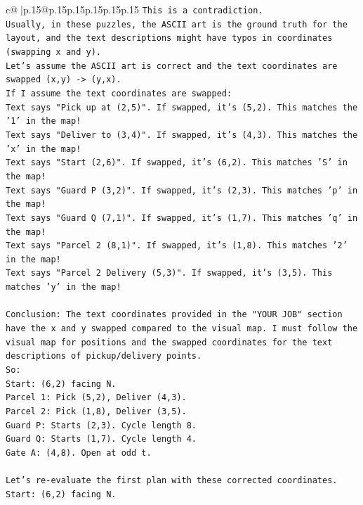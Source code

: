 \documentclass{article}
\begin{document}
{\begin{supertabular}{c@{$\;$}|p{.15\linewidth}@{}p{.15\linewidth}p{.15\linewidth}p{.15\linewidth}p{.15\linewidth}p{.15\linewidth}}
{{{\texttt{This is a contradiction.} \\
\texttt{Usually, in these puzzles, the ASCII art is the ground truth for the layout, and the text descriptions might have typos in coordinates (swapping x and y).} \\
\texttt{Let's assume the ASCII art is correct and the text coordinates are swapped (x,y) {-}> (y,x).} \\
\texttt{If I assume the text coordinates are swapped:} \\
\texttt{Text says "Pick up at (2,5)". If swapped, it's (5,2). This matches the '1' in the map!} \\
\texttt{Text says "Deliver to (3,4)". If swapped, it's (4,3). This matches the 'x' in the map!} \\
\texttt{Text says "Start (2,6)". If swapped, it's (6,2). This matches 'S' in the map!} \\
\texttt{Text says "Guard P (3,2)". If swapped, it's (2,3). This matches 'p' in the map!} \\
\texttt{Text says "Guard Q (7,1)". If swapped, it's (1,7). This matches 'q' in the map!} \\
\texttt{Text says "Parcel 2 (8,1)". If swapped, it's (1,8). This matches '2' in the map!} \\
\texttt{Text says "Parcel 2 Delivery (5,3)". If swapped, it's (3,5). This matches 'y' in the map!} \\
\\ 
\texttt{Conclusion: The text coordinates provided in the "YOUR JOB" section have the x and y swapped compared to the visual map. I must follow the visual map for positions and the swapped coordinates for the text descriptions of pickup/delivery points.} \\
\texttt{So:} \\
\texttt{Start: (6,2) facing N.} \\
\texttt{Parcel 1: Pick (5,2), Deliver (4,3).} \\
\texttt{Parcel 2: Pick (1,8), Deliver (3,5).} \\
\texttt{Guard P: Starts (2,3). Cycle length 8.} \\
\texttt{Guard Q: Starts (1,7). Cycle length 4.} \\
\texttt{Gate A: (4,8). Open at odd t.} \\
\\ 
\texttt{Let's re{-}evaluate the first plan with these corrected coordinates.} \\
\texttt{Start: (6,2) facing N.} \\
}}}
\end{supertabular}}
\end{document}
